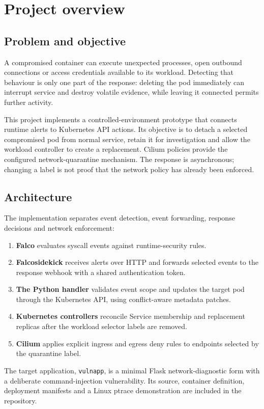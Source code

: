 \chapter{Project overview}
\label{ch:ch1}
\section{Problem and objective}
A compromised container can execute unexpected processes, open outbound connections
or access credentials available to its workload. Detecting that behaviour is only
one part of the response: deleting the pod immediately can interrupt service and
destroy volatile evidence, while leaving it connected permits further activity.

This project implements a controlled-environment prototype that connects runtime
alerts to Kubernetes API actions. Its objective is to detach a selected compromised
pod from normal service, retain it for investigation and allow the workload controller
to create a replacement. Cilium policies provide the configured network-quarantine
mechanism. The response is asynchronous; changing a label is not proof that the
network policy has already been enforced.

\section{Architecture}
The implementation separates event detection, event forwarding, response decisions
and network enforcement:
\begin{enumerate}
\item \textbf{Falco} evaluates syscall events against runtime-security rules.
\item \textbf{Falcosidekick} receives alerts over HTTP and forwards selected events
to the response webhook with a shared authentication token.
\item \textbf{The Python handler} validates event scope and updates the target pod
through the Kubernetes API, using conflict-aware metadata patches.
\item \textbf{Kubernetes controllers} reconcile Service membership and replacement
replicas after the workload selector labels are removed.
\item \textbf{Cilium} applies explicit ingress and egress deny rules to endpoints
selected by the quarantine label.
\end{enumerate}
The target application, \texttt{vulnapp}, is a minimal Flask network-diagnostic form
with a deliberate command-injection vulnerability. Its source, container definition,
deployment manifests and a Linux ptrace demonstration are included in the repository.

